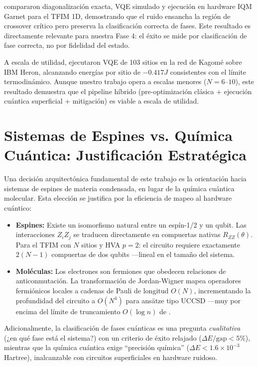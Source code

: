 \documentclass[11pt,a4paper,spanish]{book}
\begin{document}
\citet{sharma2026} compararon diagonalización exacta, VQE simulado y ejecución en hardware IQM Garnet para el TFIM 1D, demostrando que el ruido ensancha la región de crossover crítico pero preserva la clasificación correcta de fases. Este resultado es directamente relevante para nuestra Fase 4: el éxito se mide por clasificación de fase correcta, no por fidelidad del estado.

A escala de utilidad, \citet{ahsan2025} ejecutaron VQE de 103 sitios en la red de Kagomé sobre IBM Heron, alcanzando energías por sitio de $-0.417J$ consistentes con el límite termodinámico. Aunque nuestro trabajo opera a escalas menores ($N = 6$--$10$), este resultado demuestra que el pipeline híbrido (pre-optimización clásica + ejecución cuántica superficial + mitigación) es viable a escala de utilidad.

\section{Sistemas de Espines vs. Química Cuántica: Justificación Estratégica}

Una decisión arquitectónica fundamental de este trabajo es la orientación hacia sistemas de espines de materia condensada, en lugar de la química cuántica molecular. Esta elección se justifica por la eficiencia de mapeo al hardware cuántico:

\begin{itemize}
    \item \textbf{Espines:} Existe un isomorfismo natural entre un espín-1/2 y un qubit. Las interacciones $Z_i Z_j$ se traducen directamente en compuertas nativas $R_{ZZ}(\theta)$. Para el TFIM con $N$ sitios y HVA $p = 2$: el circuito requiere exactamente $2(N-1)$ compuertas de dos qubits ---lineal en el tamaño del sistema.

    \item \textbf{Moléculas:} Los electrones son fermiones que obedecen relaciones de anticonmutación. La transformación de Jordan-Wigner mapea operadores fermiónicos locales a cadenas de Pauli de longitud $O(N)$, incrementando la profundidad del circuito a $O(N^4)$ para ansätze tipo UCCSD ---muy por encima del límite de truncamiento $O(\log n)$ de \citet{mele2026}.
\end{itemize}

Adicionalmente, la clasificación de fases cuánticas es una pregunta \emph{cualitativa} (¿en qué fase está el sistema?) con un criterio de éxito relajado ($\Delta E/\text{gap} < 5\%$), mientras que la química cuántica exige ``precisión química'' ($\Delta E < 1.6 \times 10^{-3}$ Hartree), inalcanzable con circuitos superficiales en hardware ruidoso.
\end{document}
